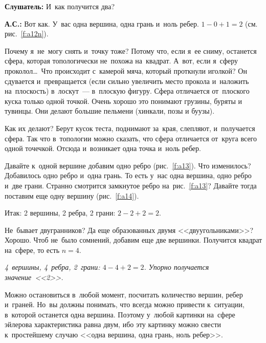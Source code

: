 \textbf{Слушатель:} И~как получится два?

\textbf{А.С.:} Вот как. У~вас одна вершина, одна грань и~ноль ребер. $1-0+1=2$ (см. рис.~\ref{f:a12n}).


Почему я~не~могу снять и~точку тоже? Потому что, если я~ее сниму, останется сфера, которая
топологически не~похожа на~квадрат. А~вот, если я~сферу проколол\ldots\ Что происходит с~камерой мяча,
который проткнули иголкой? Он сдувается и~превращается (если сильно увеличить место прокола
и~наложить на~плоскость) в~лоскут~--- в~плоскую фигуру. Сфера отличается от~плоского куска только
одной точкой. Очень хорошо это понимают грузины, буряты и тувинцы. Они делают большие пельмени (хинкали, позы и буузы).


Как их делают? Берут кусок теста, поднимают за~края, слепляют, и~получается сфера. Так что
в~топологии можно сказать, что сфера отличается от~круга всего одной точечкой. Отсюда и~возникает
одна точка и~ноль ребер.

Давайте к~одной вершине добавим одно ребро (рис.~\ref{f:a13}). Что изменилось? Добавилось одно ребро и~одна
грань. То есть у~нас одна вершина, одно ребро и~две грани. Странно смотрится замкнутое ребро
на~рис.~\ref{f:a13}? Давайте тогда поставим еще одну вершину (рис.~\ref{f:a14}).


Итак: 2 вершины, 2 ребра, 2 грани: $2-2+2=2$.


Не~бывает двугранников? Да еще образованных двумя <<двуугольниками>>? Хорошо. Чтоб не~было сомнений,
добавим еще две вершинки. Получится квадрат на~сфере, то есть $n=4$.

\textit{4~вершины, 4~ребра, 2~грани: $4-4+2=2$. Упорно получается значение~<<2>>.}

Можно остановиться в~любой момент, посчитать количество вершин, ребер и~граней. Но~вы должны
понимать, что всегда можно привести к~ситуации, в~которой останется одна вершина. Поэтому у~любой
картинки на~сфере эйлерова характеристика равна двум, ибо эту картинку можно свести к~простейшему
случаю <<одна вершина, одна грань, ноль ребер>>.


